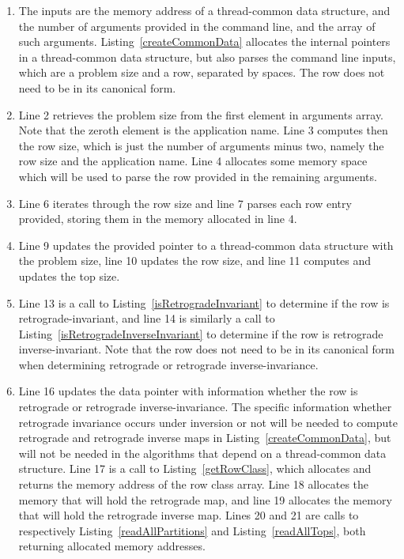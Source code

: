 \begin{enumerate}
\item The inputs are the memory address of a thread-common data structure, and the number of arguments provided in the command line, and the array of such arguments. Listing~\ref{createCommonData} allocates the internal pointers in a thread-common data structure, but also parses the command line inputs, which are a problem size and a row, separated by spaces. The row does not need to be in its canonical form.
\item Line 2 retrieves the problem size from the first element in arguments array. Note that the zeroth element is the application name. Line 3 computes then the row size, which is just the number of arguments minus two, namely the row size and the application name. Line 4 allocates some memory space which will be used to parse the row provided in the remaining arguments.
\addtocounter{enumi}{3}
\item Line 6 iterates through the row size and line 7 parses each row entry provided, storing them in the memory allocated in line 4.
\addtocounter{enumi}{2}
\item Line 9 updates the provided pointer to a thread-common data structure with the problem size, line 10 updates the row size, and line 11 computes and updates the top size.
\addtocounter{enumi}{3}
\item Line 13 is a call to Listing~\ref{isRetrogradeInvariant} to determine if the row is retrograde-invariant, and line 14 is similarly a call to Listing~\ref{isRetrogradeInverseInvariant} to determine if the row is retrograde inverse-invariant. Note that the row does not need to be in its canonical form when determining retrograde or retrograde inverse-invariance.
\addtocounter{enumi}{2}
\item Line 16 updates the data pointer with information whether the row is retrograde or retrograde inverse-invariance. The specific information whether retrograde invariance occurs under inversion or not will be needed to compute retrograde and retrograde inverse maps in Listing~\ref{createCommonData}, but will not be needed in the algorithms that depend on a thread-common data structure. Line 17 is a call to Listing~\ref{getRowClass}, which allocates and returns the memory address of the row class array. Line 18 allocates the memory that will hold the retrograde map, and line 19 allocates the memory that will hold the retrograde inverse map. Lines 20 and 21 are calls to respectively Listing~\ref{readAllPartitions} and Listing~\ref{readAllTops}, both returning allocated memory addresses.

\end{enumerate}
